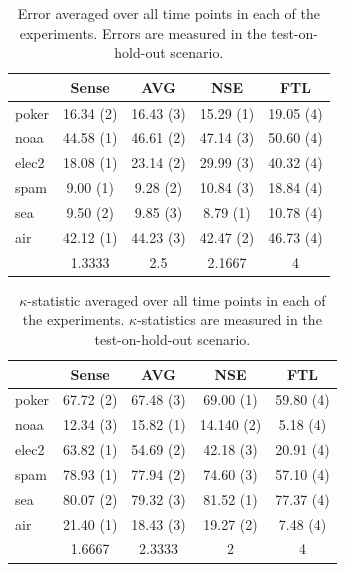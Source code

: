 \documentclass[10pt, conference]{IEEEtran}
\begin{document}
\begin{table}[p]
\caption{Error averaged over all time points in each of the experiments.  Errors are measured in the test-on-hold-out scenario.}
\begin{center}
\begin{tabular}{|l || c  c c c |}
\hline
& \bf Sense &\bf AVG &\bf NSE &\bf FTL \\
\hline
\hline
poker & 16.34 (2) & 16.43 (3) & 15.29 (1) & 19.05 (4) \\ 
noaa & 44.58 (1) & 46.61 (2) & 47.14 (3) & 50.60 (4) \\ 
elec2 & 18.08 (1) & 23.14 (2) & 29.99 (3) & 40.32 (4) \\ 
spam & 9.00 (1) & 9.28 (2) & 10.84 (3) & 18.84 (4) \\ 
sea & 9.50 (2) & 9.85 (3) & 8.79 (1) & 10.78 (4) \\ 
air & 42.12 (1) & 44.23 (3) & 42.47 (2) & 46.73 (4) \\ 
\hline
\hline
 & 1.3333 & 2.5 & 2.1667 & 4 \\ 
\hline
\end{tabular}
\end{center}
\end{table}

\begin{table}[p]
\caption{$\kappa$-statistic averaged over all time points in each of the experiments. $\kappa$-statistics are measured in the test-on-hold-out scenario.}
\begin{center}
\begin{tabular}{|l || c c c c |}
\hline
& \bf Sense &\bf AVG &\bf NSE &\bf FTL \\
\hline
\hline
poker & 67.72 (2) & 67.48 (3) & 69.00 (1) & 59.80 (4) \\ 
noaa & 12.34 (3) & 15.82 (1) & 14.140 (2) & 5.18 (4) \\ 
elec2 & 63.82 (1) & 54.69 (2) & 42.18 (3) & 20.91 (4) \\ 
spam & 78.93 (1) & 77.94 (2) & 74.60 (3) & 57.10 (4) \\ 
sea & 80.07 (2) & 79.32 (3) & 81.52 (1) & 77.37 (4) \\ 
air & 21.40 (1) & 18.43 (3) & 19.27 (2) & 7.48 (4) \\ 
\hline
\hline
 & 1.6667 & 2.3333 & 2 & 4 \\ 
\hline
\end{tabular}
\end{center}
\end{table}
\end{document}
